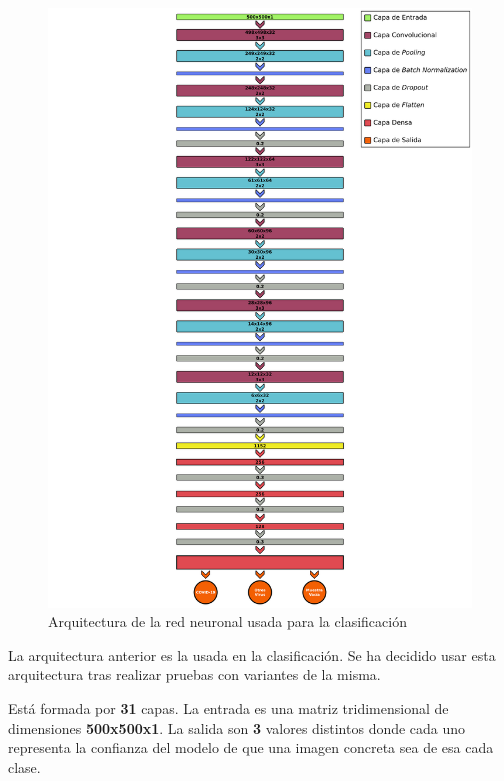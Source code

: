 \documentclass{uc3mpracticas}
\begin{document}
  \newpage

  \begin{figure}[H]
    \centering
    \includegraphics[width=\textwidth]{Images/CNN.png}
    \caption{Arquitectura de la red neuronal usada para la clasificación}
  \end{figure}

  \newpage

  La arquitectura anterior es la usada en la clasificación. Se ha decidido usar esta arquitectura tras realizar pruebas con variantes de la misma.

  \vspace{2mm}

  Está formada por \textbf{31} capas. La entrada es una matriz tridimensional de dimensiones \textbf{500x500x1}. La salida son \textbf{3} valores distintos donde cada uno representa la confianza del modelo de que una imagen concreta sea de esa cada clase.
\end{document}
